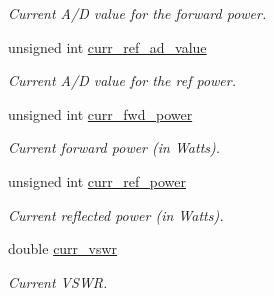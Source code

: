 \begin{CompactItemize}
\begin{CompactList}\small\item\em Current A/D value for the forward power. \item\end{CompactList}\item 
\hypertarget{structstruct__status_5e5540d4690ce95334e1069e87933f2e}{
unsigned int \hyperlink{structstruct__status_5e5540d4690ce95334e1069e87933f2e}{curr\_\-ref\_\-ad\_\-value}}
\label{structstruct__status_5e5540d4690ce95334e1069e87933f2e}

\begin{CompactList}\small\item\em Current A/D value for the ref power. \item\end{CompactList}\item 
\hypertarget{structstruct__status_22c1698ff4e210d07cf281757256c1af}{
unsigned int \hyperlink{structstruct__status_22c1698ff4e210d07cf281757256c1af}{curr\_\-fwd\_\-power}}
\label{structstruct__status_22c1698ff4e210d07cf281757256c1af}

\begin{CompactList}\small\item\em Current forward power (in Watts). \item\end{CompactList}\item 
\hypertarget{structstruct__status_4aecbcea267750bd74cd66063ffd1462}{
unsigned int \hyperlink{structstruct__status_4aecbcea267750bd74cd66063ffd1462}{curr\_\-ref\_\-power}}
\label{structstruct__status_4aecbcea267750bd74cd66063ffd1462}

\begin{CompactList}\small\item\em Current reflected power (in Watts). \item\end{CompactList}\item 
\hypertarget{structstruct__status_dfeea96b91c3ce0e328a79df0738e8a4}{
double \hyperlink{structstruct__status_dfeea96b91c3ce0e328a79df0738e8a4}{curr\_\-vswr}}
\label{structstruct__status_dfeea96b91c3ce0e328a79df0738e8a4}

\begin{CompactList}\small\item\em Current VSWR. \item\end{CompactList}\end{CompactItemize}


